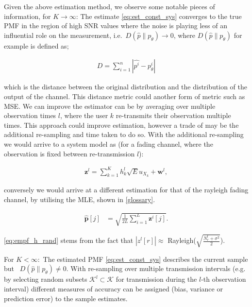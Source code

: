 \documentclass{article}
\begin{document}
Given the above estimation method, we observe some notable pieces of information, for $K \rightarrow \infty$: The estimate \cref{eq:est_const_sys} converges to the true PMF in the region of high SNR values where the noise is playing less of an influential role on the measurement, i.e.~$D(\hat{p}\| p_{\theta}) \rightarrow 0$, where $D(\hat{p}\| p_{\theta})$ for example is defined as;

\begin{align}
    D = \sum_{i=1}^n |\hat{p^i} - p_{\theta}^i|
\end{align}

which is the distance between the original distribution and the distribution of the output of the channel. This distance metric could another form of metric such as \ac{MSE}. We can improve the estimator can be by averaging over multiple observation times $l$, where the user $k$ re-transmits their observation multiple times. This approach could improve estimation, however a trade of may be the additional re-sampling and time taken to do so. With the additional re-sampling we would arrive to a system model as (for a fading channel, where the observation is fixed between re-transmission $l$):

\begin{align}
    \boldsymbol{z}^l = \sum_{k=1}^K h_k^l  \sqrt{E}u_{X_k} + \boldsymbol{w}^l, \label{eq:system_model_retrans}
\end{align}


conversely we would arrive at a different estimation for that of the rayleigh fading channel, by utilising the \ac{MLE}, shown in \cref{glossary}. 


\begin{align}
    \boldsymbol{\hat{p}}[j] &= \sqrt{\frac{1}{2L} \sum_{i = 1}^{L}\boldsymbol{z}^i[j]}.\label{eq:empf_h_rand}
\end{align}

\cref{eq:empf_h_rand} stems from the fact that $|z^l[r]| \approx$  Rayleigh($\sqrt{\frac{N_{r}^l + \sigma^2}{2}}$).

For $K <\infty:$ The estimated PMF \cref{eq:est_const_sys} describes the current sample but ~$D(\hat{p}\| p_{\theta}) \neq 0$. With re-sampling over multiple transmission intervals (e.g. by selecting random subsets $\mathcal{K}^l \subset \mathcal{K}$ for transmission during the $l$-th observation interval) different measures of accuracy can be assigned (bias, variance or prediction error) to the sample estimates.
\end{document}
